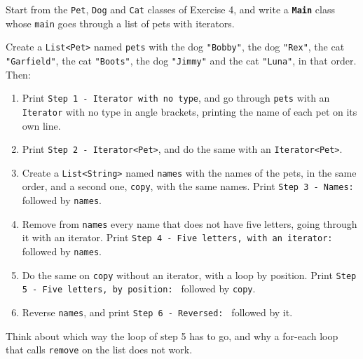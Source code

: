 Start from the \texttt{Pet}, \texttt{Dog} and \texttt{Cat} classes of Exercise 4, and write a \textbf{\texttt{Main}} class whose \texttt{main} goes through a list of pets with iterators.

Create a \texttt{List<Pet>} named \texttt{pets} with the dog \texttt{"Bobby"}, the dog \texttt{"Rex"}, the cat \texttt{"Garfield"}, the cat \texttt{"Boots"}, the dog \texttt{"Jimmy"} and the cat \texttt{"Luna"}, in that order. Then:

\begin{enumerate}

    \item Print \texttt{Step 1 - Iterator with no type}, and go through \texttt{pets} with an \texttt{Iterator} with no type in angle brackets, printing the name of each pet on its own line.

    \item Print \texttt{Step 2 - Iterator<Pet>}, and do the same with an \texttt{Iterator<Pet>}.

    \item Create a \texttt{List<String>} named \texttt{names} with the names of the pets, in the same order, and a second one, \texttt{copy}, with the same names. Print \texttt{Step 3 - Names: } followed by \texttt{names}.

    \item Remove from \texttt{names} every name that does not have five letters, going through it with an iterator. Print \texttt{Step 4 - Five letters, with an iterator: } followed by \texttt{names}.

    \item Do the same on \texttt{copy} without an iterator, with a loop by position. Print \texttt{Step 5 - Five letters, by position: } followed by \texttt{copy}.

    \item Reverse \texttt{names}, and print \texttt{Step 6 - Reversed: } followed by it.

\end{enumerate}

Think about which way the loop of step 5 has to go, and why a for-each loop that calls \texttt{remove} on the list does not work.
